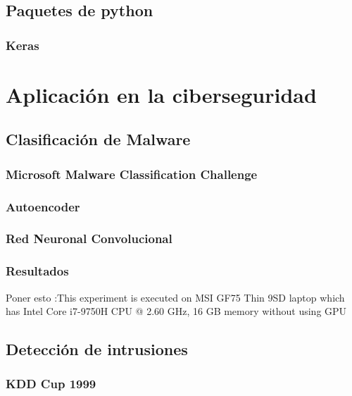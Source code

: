 \documentclass[12pt,a4paper]{book}
\begin{document}
\section{Paquetes de python} \label{Subsec: 3_3}
\subsection{Keras}



\chapter{Aplicación en la ciberseguridad} \label{Capitulo_3}

\section{Clasificación de Malware}
\subsection{Microsoft Malware Classification Challenge}
\subsection{Autoencoder}
\subsection{Red Neuronal Convolucional}
\subsection{Resultados}
Poner esto :This experiment is executed on MSI GF75 Thin 9SD laptop which has Intel Core i7-9750H CPU @ 2.60 GHz, 16 GB memory without using GPU

\section{Detección de intrusiones}
\subsection{KDD Cup 1999}
\end{document}
